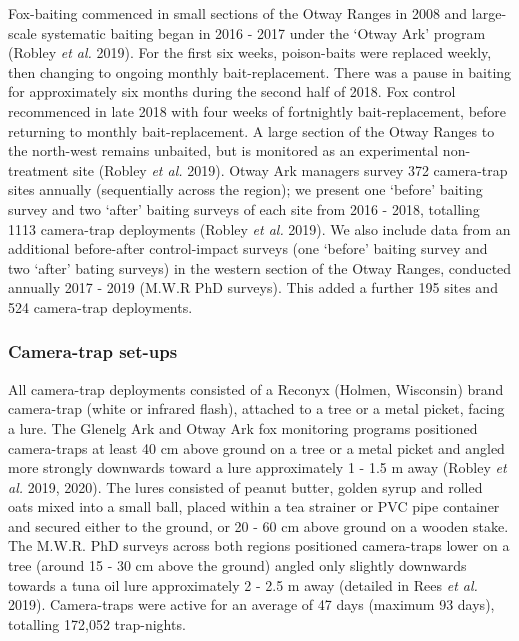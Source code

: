 \documentclass[11pt,a4paper,titlepage,twoside,openright]{style/unimelbthesis}
\begin{document}
\begin{mainmatter}
Fox-baiting commenced in small sections of the Otway Ranges in 2008 and large-scale systematic baiting began in 2016 - 2017 under the `Otway Ark' program (Robley \emph{et al.} 2019). For the first six weeks, poison-baits were replaced weekly, then changing to ongoing monthly bait-replacement. There was a pause in baiting for approximately six months during the second half of 2018. Fox control recommenced in late 2018 with four weeks of fortnightly bait-replacement, before returning to monthly bait-replacement. A large section of the Otway Ranges to the north-west remains unbaited, but is monitored as an experimental non-treatment site (Robley \emph{et al.} 2019). Otway Ark managers survey 372 camera-trap sites annually (sequentially across the region); we present one `before' baiting survey and two `after' baiting surveys of each site from 2016 - 2018, totalling 1113 camera-trap deployments (Robley \emph{et al.} 2019). We also include data from an additional before-after control-impact surveys (one `before' baiting survey and two `after' bating surveys) in the western section of the Otway Ranges, conducted annually 2017 - 2019 (M.W.R PhD surveys). This added a further 195 sites and 524 camera-trap deployments.

\hypertarget{camera-trap-set-ups}{%
\subsubsection{Camera-trap set-ups}\label{camera-trap-set-ups}}

All camera-trap deployments consisted of a Reconyx (Holmen, Wisconsin) brand camera-trap (white or infrared flash), attached to a tree or a metal picket, facing a lure. The Glenelg Ark and Otway Ark fox monitoring programs positioned camera-traps at least 40 cm above ground on a tree or a metal picket and angled more strongly downwards toward a lure approximately 1 - 1.5 m away (Robley \emph{et al.} 2019, 2020). The lures consisted of peanut butter, golden syrup and rolled oats mixed into a small ball, placed within a tea strainer or PVC pipe container and secured either to the ground, or 20 - 60 cm above ground on a wooden stake. The M.W.R. PhD surveys across both regions positioned camera-traps lower on a tree (around 15 - 30 cm above the ground) angled only slightly downwards towards a tuna oil lure approximately 2 - 2.5 m away (detailed in Rees \emph{et al.} 2019). Camera-traps were active for an average of 47 days (maximum 93 days), totalling 172,052 trap-nights.

\hypertarget{study-species-1}{%
}
\end{mainmatter}
\end{document}

